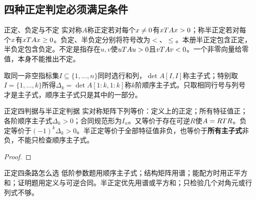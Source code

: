 \subsection{四种正定判定必须满足条件}
\begin{definition}{正定、负定与不定}
实对称$A$称正定若对每个$x\ne0$有$xT Ax>0$；称半正定若对每个$x$有$xT Ax\ge0$。负定、半负定分别将符号改为$<$、$\le$。本册半正定包含正定，半负定包含负定。不定是指存在$u,v$使$uT Au>0$且$vT Av<0$。一个非零向量给零值，本身不能推出不定。

取同一非空指标集$I\subseteq\{1,\ldots,n\}$同时选行和列，$\det A[I,I]$称主子式；特别取$I=\{1,\ldots,k\}$所得$\Delta_k=\det A[1\!:\!k,1\!:\!k]$称$k$阶顺序主子式。只取相同行号与列号才是主子式，顺序主子式只是其中的一部分。
\end{definition}
\begin{theorem}{正定四判据与半正定判据}
实对称矩阵下列等价：定义上的正定；所有特征值正；各阶顺序主子式$\Delta_k>0$；合同规范形为$I_n$。又等价于存在可逆$R$使$A=RT R$。负定等价于$(-1)^k\Delta_k>0$。半正定等价于全部特征值非负，也等价于\textbf{所有主子式}非负，不能只检查顺序主子式。
\end{theorem}
\begin{proof}

\end{proof}
\begin{method}{正定四条路怎么选}
低阶参数题用顺序主子式；结构矩阵用谱；能配方时用正平方和；证明题用定义与可逆合同。半正定优先用谱或平方和；只检验几个对角元或行列式不够。
\end{method}



